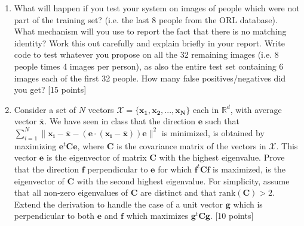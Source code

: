\documentclass[11pt]{article}
\begin{document}
\begin{enumerate}
\item What will happen if you test your system on images of people which were not part of the training set? (i.e. the last 8 people from the ORL database). What mechanism will you use to report the fact that there is no matching identity? Work this out carefully and explain briefly in your report. Write code to test whatever you propose on all the 32 remaining images (i.e. 8 people times 4 images per person), as also the entire test set containing 6 images each of the first 32 people. How many false positives/negatives did you get? \textsf{[15 points]}

\item Consider a set of $N$ vectors $\mathcal{X} = \{\boldsymbol{x_1}, \boldsymbol{x_2}, ..., \boldsymbol{x_N}\}$ each in $\mathbb{R}^d$, with average vector $\boldsymbol{\bar{x}}$. We have seen in class that the direction $\boldsymbol{e}$ such that $\sum_{i=1}^N \|\boldsymbol{x_i}-\boldsymbol{\bar{x}}-(\boldsymbol{e} \cdot (\boldsymbol{x_i}-\boldsymbol{\bar{x}}))\boldsymbol{e}\|^2$ is minimized, is obtained by maximizing $\boldsymbol{e}^t \boldsymbol{C} \boldsymbol{e}$, where $\boldsymbol{C}$ is the covariance matrix of the vectors in $\mathcal{X}$. This vector $\boldsymbol{e}$ is the eigenvector of matrix $\boldsymbol{C}$ with the highest eigenvalue. Prove that the direction $\boldsymbol{f}$ perpendicular to $\boldsymbol{e}$ for which $\boldsymbol{f}^t \boldsymbol{C} \boldsymbol{f}$ is maximized, is the eigenvector of $\boldsymbol{C}$ with the second highest eigenvalue. For simplicity, assume that all non-zero eigenvalues of $\boldsymbol{C}$ are distinct and that $\textrm{rank}(\boldsymbol{C}) > 2$. Extend the derivation to handle the case of a unit vector $\boldsymbol{g}$ which is perpendicular to both $\boldsymbol{e}$ and $\boldsymbol{f}$ which maximizes $\boldsymbol{g}^t \boldsymbol{Cg}$. \textsf{[10 points]}


\end{enumerate}
\end{document}
